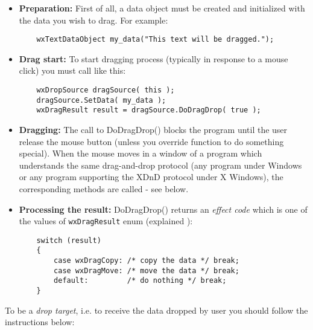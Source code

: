 \begin{itemize}\itemsep=0pt
\item {\bf Preparation:} First of all, a data object must be created and
initialized with the data you wish to drag. For example:

\begin{verbatim}
	wxTextDataObject my_data("This text will be dragged.");
\end{verbatim}
\item{\bf Drag start:} To start dragging process (typically in response to a
mouse click) you must call 
like this:

\begin{verbatim}
	wxDropSource dragSource( this );
	dragSource.SetData( my_data );
	wxDragResult result = dragSource.DoDragDrop( true );
\end{verbatim}
\item {\bf Dragging:} The call to DoDragDrop() blocks the program until the user release the
mouse button (unless you override  function
to do something special). When the mouse moves in a window of a program which understands the
same drag-and-drop protocol (any program under Windows or any program supporting the
XDnD protocol under X Windows), the corresponding  methods
are called - see below.
\item {\bf Processing the result:} DoDragDrop() returns an {\it effect code} which
is one of the values of {\tt wxDragResult} enum (explained ):

\begin{verbatim}
	switch (result)
	{
	    case wxDragCopy: /* copy the data */ break;
	    case wxDragMove: /* move the data */ break;
	    default:         /* do nothing */ break;
	}
\end{verbatim}
\end{itemize}

To be a {\it drop target}, i.e. to receive the data dropped by user you should
follow the instructions below:

